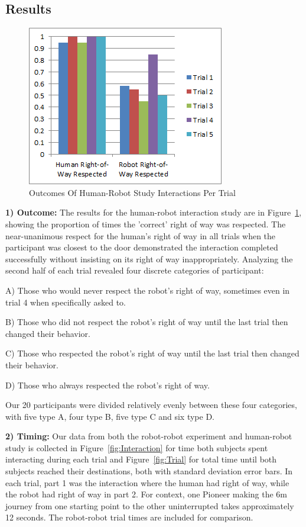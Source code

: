 \documentclass[letterpaper, 10 pt, conference]{ieeeconf}  %
\begin{document}
\subsection{Results}

     \begin{figure}
      \centering
      \includegraphics{outcomes.png}
      \caption{Outcomes Of Human-Robot Study Interactions Per Trial}
      \label{fig:Outcomes}
   \end{figure}

\textbf{1) Outcome:} The results for the human-robot interaction study are in Figure~\ref{fig:Outcomes}, showing the proportion of times the 'correct' right of way was respected. The near-unanimous respect for the human's right of way in all trials when the participant was closest to the door demonstrated the interaction completed successfully without insisting on its right of way inappropriately. Analyzing the second half of each trial revealed four discrete categories of participant: 

A) Those who would never respect the robot's right of way, sometimes even in trial 4 when specifically asked to. 

B) Those who did not respect the robot's right of way until the last trial then changed their behavior. 

C) Those who respected the robot's right of way until the last trial then changed their behavior. 

D) Those who always respected the robot's right of way. 

Our 20 participants were divided relatively evenly between these four categories, with five type A, four type B, five type C and six type D.
 
\textbf{2) Timing:} Our data from both the robot-robot experiment and human-robot study is collected in Figure~\ref{fig:Interaction} for time both subjects spent interacting during each trial and Figure~\ref{fig:Trial} for total time until both subjects reached their destinations, both with standard deviation error bars. In each trial, part 1 was the interaction where the human had right of way, while the robot had right of way in part 2. For context, one Pioneer making the 6m journey from one starting point to the other uninterrupted takes approximately 12 seconds. The robot-robot trial times are included for comparison.  
 
\end{document}
